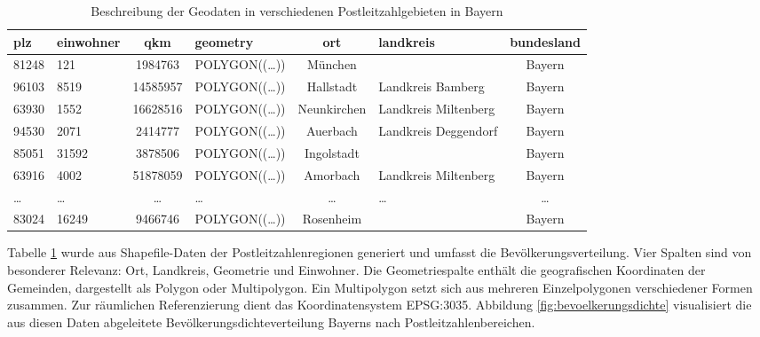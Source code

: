 \begin{table}[htbp]
    \centering
    \small  %
    \caption{Beschreibung der Geodaten in verschiedenen Postleitzahlgebieten in Bayern}
    \label{tab:geodaten}
    \begin{tabularx}{\textwidth}{lXcXcXc}
        \toprule
        \textbf{plz} & \textbf{einwohner} & \textbf{qkm} & \textbf{geometry} & \textbf{ort} & \textbf{landkreis} & \textbf{bundesland} \\
        \midrule
        81248 & 121  & 1984763  & POLYGON((…)) & München & & Bayern \\
        96103 & 8519 & 14585957   & POLYGON((…)) & Hallstadt & Landkreis Bamberg & Bayern \\
        63930 & 1552 & 16628516 & POLYGON((…)) & Neunkirchen & Landkreis Miltenberg & Bayern \\
        94530 & 2071 & 2414777 & POLYGON((…)) & Auerbach & Landkreis Deggendorf & Bayern \\
        85051 & 31592 & 3878506 & POLYGON((…)) & Ingolstadt & & Bayern \\
        63916 & 4002 & 51878059 & POLYGON((…)) & Amorbach & Landkreis Miltenberg & Bayern \\
        \dots & \dots & \dots & \dots & \dots & \dots & \dots \\
        83024 & 16249 & 9466746 & POLYGON((…)) & Rosenheim & & Bayern \\
        \bottomrule
    \end{tabularx}
\end{table}
\FloatBarrier

Tabelle \ref{tab:geodaten} wurde aus Shapefile-Daten der Postleitzahlenregionen generiert und umfasst die Bevölkerungsverteilung. Vier Spalten sind von besonderer Relevanz: Ort, Landkreis, Geometrie und Einwohner. Die Geometriespalte enthält die geografischen Koordinaten der Gemeinden, dargestellt als Polygon oder Multipolygon. Ein Multipolygon setzt sich aus mehreren Einzelpolygonen verschiedener Formen zusammen. Zur räumlichen Referenzierung dient das Koordinatensystem EPSG:3035. Abbildung \ref{fig:bevoelkerungsdichte} visualisiert die aus diesen Daten abgeleitete Bevölkerungsdichteverteilung Bayerns nach Postleitzahlenbereichen.

